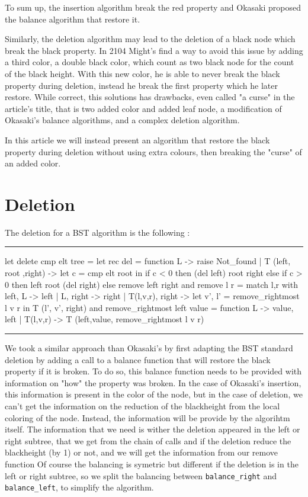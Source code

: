 \documentclass[10pt,a4paper]{article}
\newcommand{\code}{\texttt}
\newenvironment{codeblock}%
{\center \minipage{\textwidth} \vspace{6pt} \hrule \vspace{6pt} \minted{ocaml}}%
{\endminted \hrule \vspace{6pt} \endminipage \endcenter}
\begin{document}
To sum up, the insertion algorithm break the red property and Okasaki proposed the balance algorithm that restore it.


Similarly, the deletion algorithm may lead to the deletion of a black node which break the black property. In 2104 Might's find a way to avoid this issue by adding a third color, a double black color, which count as two black node for the count of the black height. With this new color, he is able to never break the black property during deletion, instead he break the first property which he later restore. While correct, this solutions has drawbacks, even called "a curse" in the article's title, that is two added color and added leaf node, a modification of Okasaki's balance algorithms, and a complex deletion algorithm.


In this article we will instead present an algorithm that restore the black property during deletion without using extra colours, then breaking the "curse" of an added color.

\section{Deletion}

The deletion for a BST algorithm is the following :
\begin{codeblock}
let delete cmp elt tree =
    let rec del = function
        L -> raise Not_found
      | T (left, root ,right) ->
        let c = cmp elt root in
        if c < 0 then (del left) root right
        else if c > 0 then left root (del right)
        else remove left right
    and remove l r = match l,r with
        left, L  -> left
      | L, right -> right
      | T(l,v,r), right ->
        let v', l' = remove_rightmost l v r in
        T (l', v', right)
    and remove_rightmost left value = function
        L -> value, left
      | T(l,v,r) -> T (left,value, remove_rightmost l v r)
\end{codeblock}


We took a similar approach than Okasaki's by first adapting the BST standard deletion by adding a call to a balance function that will restore the black property if it is broken.
To do so, this balance function needs to be provided with information on "how" the property was broken.
In the case of Okasaki's insertion, this information is present in the color of the node, but in the case of deletion, we can't get the information on the reduction of the blackheight from the local coloring of the node.
Instead, the information will be provide by the algorihtm itself.
The information that we need is wither the deletion appeared in the left or right subtree, that we get from the chain of calls and if the deletion reduce the blackheight (by 1) or not, and we will get the information from our remove function
Of course the balancing is symetric but different if the deletion is in the left or right subtree, so we split the balancing between \code{balance_right} and \code{balance_left}, to simplify the algorithm.
\end{document}
